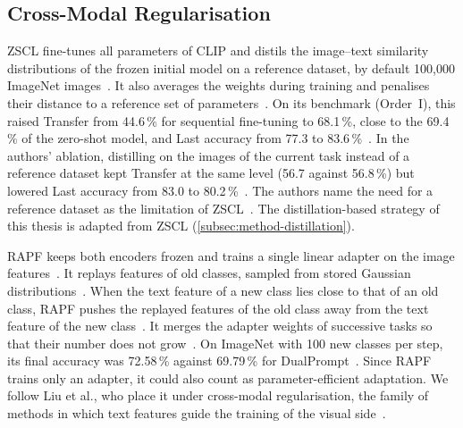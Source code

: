 \subsection{Cross-Modal Regularisation}

ZSCL fine-tunes all parameters of CLIP and distils the image--text similarity distributions of the frozen initial model on a reference dataset, by default 100{,}000 ImageNet images~\cite{zheng2023preventingzeroshottransferdegradation}.
It also averages the weights during training and penalises their distance to a reference set of parameters~\cite{zheng2023preventingzeroshottransferdegradation}.
On its benchmark (Order~I), this raised Transfer from 44.6\,\% for sequential fine-tuning to 68.1\,\%, close to the 69.4\,\% of the zero-shot model, and Last accuracy from 77.3 to 83.6\,\%~\cite{zheng2023preventingzeroshottransferdegradation}.
In the authors' ablation, distilling on the images of the current task instead of a reference dataset kept Transfer at the same level (56.7 against 56.8\,\%) but lowered Last accuracy from 83.0 to 80.2\,\%~\cite{zheng2023preventingzeroshottransferdegradation}.
The authors name the need for a reference dataset as the limitation of ZSCL~\cite{zheng2023preventingzeroshottransferdegradation}.
The distillation-based strategy of this thesis is adapted from ZSCL (\cref{subsec:method-distillation}).

RAPF keeps both encoders frozen and trains a single linear adapter on the image features~\cite{huang2024classincrementallearningclipadaptive}.
It replays features of old classes, sampled from stored Gaussian distributions~\cite{huang2024classincrementallearningclipadaptive}.
When the text feature of a new class lies close to that of an old class, RAPF pushes the replayed features of the old class away from the text feature of the new class~\cite{huang2024classincrementallearningclipadaptive}.
It merges the adapter weights of successive tasks so that their number does not grow~\cite{huang2024classincrementallearningclipadaptive}.
On ImageNet with 100 new classes per step, its final accuracy was 72.58\,\% against 69.79\,\% for DualPrompt~\cite{huang2024classincrementallearningclipadaptive}.
Since RAPF trains only an adapter, it could also count as parameter-efficient adaptation.
We follow Liu et al., who place it under cross-modal regularisation, the family of methods in which text features guide the training of the visual side~\cite[Sec.~4.2]{liu2026continuallearningvlmssurvey}.

